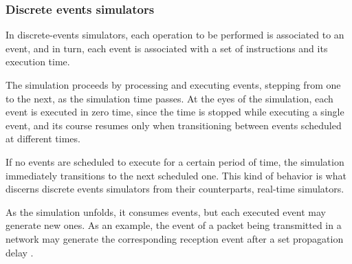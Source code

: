 \subsubsection{Discrete events simulators}
In discrete-events simulators, each operation to be performed is associated to an event, and in turn, each event is associated with a set of instructions and its execution time. 

The simulation proceeds by processing and executing events, stepping from one to the next, as the simulation time passes. At the eyes of the simulation, each event is executed in zero time, since the time is stopped while executing a single event, and its course resumes only when transitioning between events scheduled at different times.

If no events are scheduled to execute for a certain period of time, the simulation immediately transitions to the next scheduled one. This kind of behavior is what discerns discrete events simulators from their counterparts,  real-time simulators.

As the simulation unfolds, it consumes events, but each executed event may generate new ones. As an example, the event of a packet being transmitted in a network may generate the corresponding reception event after a set propagation delay \cite{review-ns3}.

